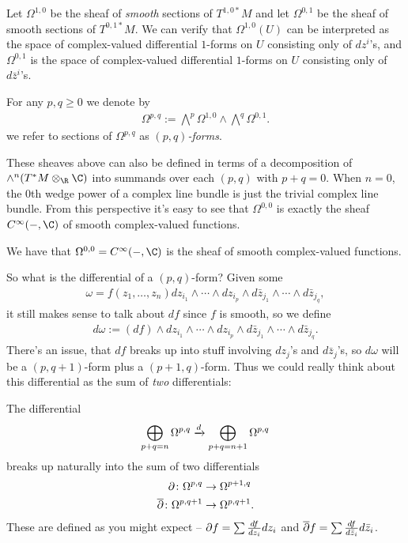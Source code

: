 \documentclass[11pt]{book}
\begin{document}
\begin{notation} Let $\Omega^{1,0}$ be the sheaf of \emph{smooth} sections of $T^{1,0 \ast} M$ and let $\Omega^{0,1}$ be the sheaf of smooth sections of $T^{0,1 \ast}M$. We can verify that $\Omega^{1,0}(U)$ can be interpreted as the space of complex-valued differential $1$-forms on $U$ consisting only of $dz^i$'s, and $\Omega^{0,1}$ is the space of complex-valued differential $1$-forms on $U$ consisting only of $d \bar{z}^i$'s.

For any $p,q\ge0$ we denote by
\begin{align*}
    \Omega^{p,q} := \bigwedge^p \Omega^{1,0} \wedge \bigwedge^q \Omega^{0,1}.
\end{align*}
we refer to sections of $\Omega^{p,q}$ as \emph{$(p,q)$-forms}.
\end{notation}

\begin{note} These sheaves above can also be defined in terms of a decomposition of $\wedge^n (T^\ast M \otimes_\R \C)$ into summands over each $(p,q)$ with $p+q=0$. When $n=0$, the $0$th wedge power of a complex line bundle is just the trivial complex line bundle. From this perspective it's easy to see that $\Omega^{0,0}$ is exactly the sheaf $C^\infty(-,\C)$ of smooth complex-valued functions.
\end{note}

\begin{remark} We have that $\Omega^{0,0} = C^\infty(-,\C)$ is the sheaf of smooth complex-valued functions.
\end{remark}

So what is the differential of a $(p,q)$-form? Given some
\begin{align*}
    \omega = f(z_1, \ldots, z_n) dz_{i_1}\wedge \cdots \wedge dz_{i_p} \wedge d \bar{z}_{j_1} \wedge \cdots \wedge d \bar{z}_{j_q},
\end{align*}
it still makes sense to talk about $df$ since $f$ is smooth, so we define
\begin{align*}
    d\omega := (df) \wedge dz_{i_1}\wedge \cdots \wedge dz_{i_p} \wedge d \bar{z}_{j_1} \wedge \cdots \wedge d \bar{z}_{j_q}.
\end{align*}
There's an issue, that $df$ breaks up into stuff involving $dz_j$'s and $d \bar{z}_j$'s, so $d\omega$ will be a $(p,q+1)$-form plus a $(p+1,q)$-form. Thus we could really think about this differential as the sum of \emph{two} differentials:

\begin{proposition} The differential
\begin{align*}
    \bigoplus_{p+q=n} \Omega^{p,q} \xrightarrow{d} \bigoplus_{p+q=n+1} \Omega^{p,q}
\end{align*}
breaks up naturally into the sum of two differentials
\begin{align*}
    \partial \colon \Omega^{p,q} &\to \Omega^{p+1,q} \\
    \overline{\partial} \colon \Omega^{p,q+1} &\to \Omega^{p,q+1}.
\end{align*}
These are defined as you might expect -- $\partial f = \sum \frac{df}{dz_i} dz_i$ and $\overline{\partial} f = \sum \frac{df}{d \bar{z}_i} d \bar{z}_i$.
\end{proposition}
\end{document}
